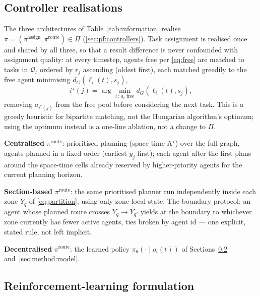 \documentclass[../main.tex]{subfiles}
\begin{document}
\subsection{Controller realisations}
\label{sec:method:controllers}

The three architectures of Table~\ref{tab:information} realise
$\pi=(\pi^{\text{assign}},\pi^{\text{route}}) \in \Pi$
(\ref{sec:pf:controllers}). Task assignment is realised once and shared by
all three, so that a result difference is never confounded with assignment
quality: at every timestep, agents free per \eqref{eq:free} are matched to
tasks in $\mathcal{Q}_t$ ordered by $r_j$ ascending (oldest first), each
matched greedily to the free agent minimising $d_G(\ell_i(t), s_j)$,
\begin{equation}
  i^\star(j) = \arg\min_{i \,:\, a_i \text{ free}} d_G(\ell_i(t), s_j) ,
  \label{eq:assignmentrule}
\end{equation}
removing $a_{i^\star(j)}$ from the free pool before considering the next
task. This is a greedy heuristic for bipartite matching, not the Hungarian
algorithm's optimum; using the optimum instead is a one-line ablation, not a
change to $\Pi$.

\textbf{Centralised} $\pi^{\text{route}}$: prioritised planning
(space-time A$^\star$) over the full graph, agents planned in a fixed order
(earliest $y_j$ first); each agent after the first plans around the
space-time cells already reserved by higher-priority agents for the current
planning horizon.

\textbf{Section-based} $\pi^{\text{route}}$: the same prioritised planner run
independently inside each zone $Y_q$ of \eqref{eq:partition}, using only
zone-local state. The boundary protocol: an agent whose planned route crosses
$Y_q \to Y_{q'}$ yields at the boundary to whichever zone currently has fewer
active agents, ties broken by agent id --- one explicit, stated rule, not left
implicit.

\textbf{Decentralised} $\pi^{\text{route}}$: the learned policy
$\pi_\theta(\cdot\mid o_i(t))$ of Sections~\ref{sec:method:rl}
and~\ref{sec:method:model}.

\subsection{Reinforcement-learning formulation}
\label{sec:method:rl}
\end{document}
